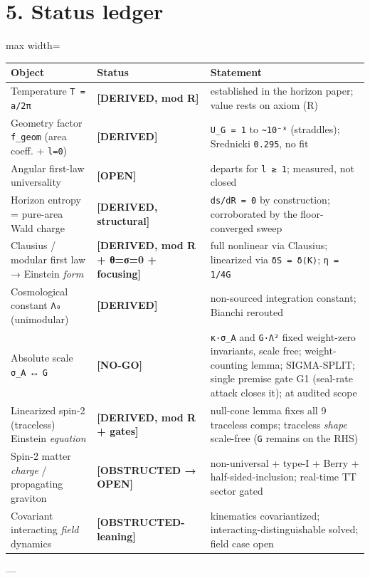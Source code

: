 \documentclass[11pt]{article}
\begin{document}
\section*{5. Status ledger}
\begin{center}
\begin{adjustbox}{max width=\textwidth}
\begin{tabular}{lll}
Object & Status & Statement \\
\hline
Temperature \texttt{T = a/2π} & \textbf{[DERIVED, mod R]} & established in the horizon paper; value rests on axiom (R) \\
Geometry factor \texttt{f\_geom} (area coeff. + \texttt{l=0}) & \textbf{[DERIVED]} & \texttt{U\_G = 1} to \texttt{\textasciitilde{}10⁻³} (straddles); Srednicki \texttt{0.295}, no fit \\
Angular first-law universality & \textbf{[OPEN]} & departs for \texttt{l ≥ 1}; measured, not closed \\
Horizon entropy = pure-area Wald charge & \textbf{[DERIVED, structural]} & \texttt{ds/dR = 0} by construction; corroborated by the floor-converged sweep \\
Clausius / modular first law → Einstein \emph{form} & \textbf{[DERIVED, mod R + θ=σ=0 + focusing]} & full nonlinear via Clausius; linearized via \texttt{δS = δ⟨K⟩}; \texttt{η = 1/4G} \\
Cosmological constant \texttt{Λ₀} (unimodular) & \textbf{[DERIVED]} & non-sourced integration constant; Bianchi rerouted \\
Absolute scale \texttt{σ\_A} ↔ \texttt{G} & \textbf{[NO-GO]} & \texttt{κ·σ\_A} and \texttt{G·Λ²} fixed weight-zero invariants, scale free; weight-counting lemma; SIGMA-SPLIT; single premise gate G1 (seal-rate attack closes it); at audited scope \\
Linearized spin-2 (traceless) Einstein \emph{equation} & \textbf{[DERIVED, mod R + gates]} & null-cone lemma fixes all 9 traceless comps; traceless \emph{shape} scale-free (\texttt{G} remains on the RHS) \\
Spin-2 matter \emph{charge} / propagating graviton & \textbf{[OBSTRUCTED → OPEN]} & non-universal + type-I + Berry + half-sided-inclusion; real-time TT sector gated \\
Covariant interacting \emph{field} dynamics & \textbf{[OBSTRUCTED-leaning]} & kinematics covariantized; interacting-distinguishable solved; field case open \\
\end{tabular}
\end{adjustbox}
\end{center}
---
\end{document}
